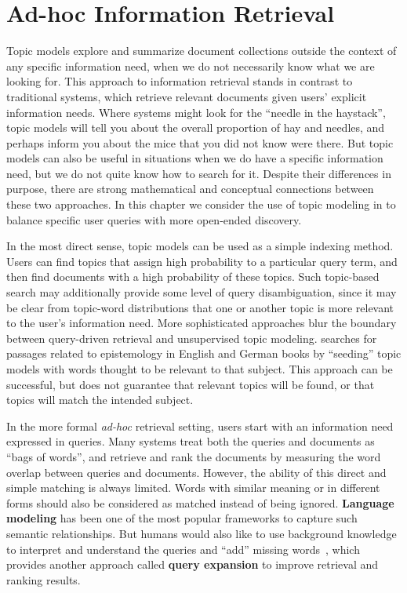 \chapter{Ad-hoc Information Retrieval}
\label{ch:ir}

Topic models explore and summarize document collections outside the context of any specific information need, when we do not necessarily know what we are looking for.
This approach to information retrieval stands in contrast to traditional  systems, which retrieve relevant documents given users' explicit information needs.
Where  systems might look for the ``needle in the haystack'', topic models will tell you about the overall proportion of hay and needles, and perhaps inform you about the mice that you did not know were there.
But topic models can also be useful in situations when we do have a specific information need, but we do not quite know how to search for it.
Despite their differences in purpose, there are strong mathematical and conceptual connections between these two approaches.
In this chapter we consider the use of topic modeling in  to balance specific user queries with more open-ended discovery.

In the most direct sense, topic models can be used as a simple indexing method.
Users can find topics that assign high probability to a particular
query term, and then find documents with a high probability of these topics.
Such topic-based search may additionally provide some level of query disambiguation, since it may be clear from topic-word distributions that one or another topic is more relevant to the user's information need.
More sophisticated approaches blur the boundary between query-driven retrieval and unsupervised topic modeling.
\citet{erlin2017topic} searches for passages related to epistemology in English and German books by ``seeding'' topic models with words thought to be relevant to that subject.
This approach can be successful, but does not guarantee that relevant topics will be found, or that topics will match the intended subject.

In the more formal \textit{ad-hoc} retrieval setting, users start with an information need expressed in queries. Many  systems treat both the queries and documents as ``bags of words'', and retrieve and rank the documents by measuring the word overlap between queries and documents.
However, the ability of this direct and simple matching is always
limited. Words with similar meaning or in different forms should also
be considered as matched instead of being ignored. \textbf{Language
  modeling} has been one of the most popular frameworks to capture
such semantic relationships. But humans would also like to use background
knowledge to interpret and understand the queries and ``add'' missing
words~\citep{wei-07}, which provides another approach called \textbf{query expansion} to improve retrieval and ranking results.


